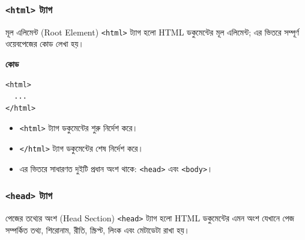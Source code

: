\subsubsection{\texttt{<html>} ট্যাগ}

\begin{definitionbox}{মূল এলিমেন্ট (Root Element)}
\texttt{<html>} ট্যাগ হলো HTML ডকুমেন্টের মূল এলিমেন্ট; এর ভিতরে সম্পূর্ণ ওয়েবপেজের কোড লেখা হয়।
\end{definitionbox}

\par\noindent
\begin{minipage}[t]{.50\linewidth}\vspace{0pt}\small
\textbf{\color{chFourTeal}কোড}\par
\begin{verbatim}
<html>
  ...
</html>
\end{verbatim}

\par\smallskip
\end{minipage}\hfill
\begin{minipage}[t]{.46\linewidth}\vspace{0pt}\small
\begin{itemize}
\item \texttt{<html>} ট্যাগ ডকুমেন্টের শুরু নির্দেশ করে।
\item \texttt{</html>} ট্যাগ ডকুমেন্টের শেষ নির্দেশ করে।
\item এর ভিতরে সাধারণত দুইটি প্রধান অংশ থাকে: \texttt{<head>} এবং \texttt{<body>}।
\end{itemize}
\end{minipage}\par


\subsubsection{\texttt{<head>} ট্যাগ}

\begin{definitionbox}{পেজের তথ্যের অংশ (Head Section)}
\texttt{<head>} ট্যাগ হলো HTML ডকুমেন্টের এমন অংশ যেখানে পেজ সম্পর্কিত তথ্য, শিরোনাম, রীতি, স্ক্রিপ্ট, লিংক এবং মেটাডেটা রাখা হয়।
\end{definitionbox}

